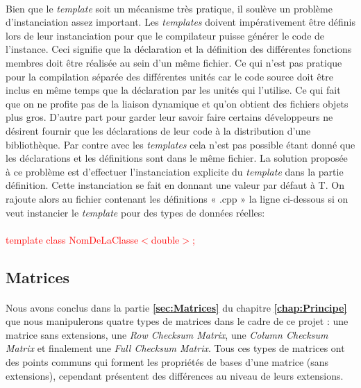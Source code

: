 \documentclass[a4paper, 10pt]{report}
\begin{document}
\paragraph*{}
Bien que le \textit{template} soit un mécanisme très pratique, il soulève un problème d’instanciation assez important. 
Les \textit{templates} doivent impérativement être définis lors de leur instanciation pour que le compilateur puisse générer 
le code de l’instance. Ceci signifie que la déclaration et la définition des différentes fonctions membres doit être réalisée 
au sein d’un même fichier. Ce qui n'est pas pratique pour la compilation séparée des différentes unités car le code source doit
\^etre inclus en m\^eme temps que la déclaration par les unités qui l'utilise. Ce qui fait que on ne profite pas de la liaison dynamique et qu'on
obtient des fichiers objets plus gros. D'autre part pour garder leur savoir 
faire certains développeurs ne désirent fournir que les déclarations de leur code à la distribution d’une bibliothèque. Par contre 
avec les \textit{templates} cela n’est pas possible étant donné que les déclarations et les définitions sont dans le même 
fichier.\newline
La solution proposée à ce problème est d’effectuer l’instanciation explicite du \textit{template} dans la partie 
définition. Cette instanciation se fait en donnant une valeur par défaut à T. On rajoute alors au fichier contenant 
les définitions « .cpp » la ligne ci-dessous si on veut instancier le \textit{template} pour des types de données réelles:\paragraph*{}
\textcolor{red}{template class NomDeLaClasse$<$double$>$;}
\subsection{Matrices}
\paragraph*{}
Nous avons conclus dans la partie \textbf{\ref{sec:Matrices}} du chapitre \textbf{\ref{chap:Principe}} que nous manipulerons quatre types de matrices dans le cadre 
de ce projet : 
une matrice sans extensions, une \textit{Row Checksum Matrix}, une \textit{Column Checksum Matrix} et finalement une 
\textit{Full Checksum Matrix}. Tous ces types de matrices ont des points communs qui forment les propriétés de bases 
d’une matrice (sans extensions), cependant présentent des différences au niveau de leurs extensions.
\end{document}
